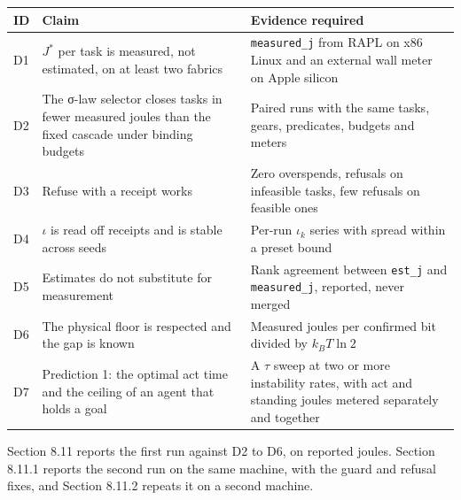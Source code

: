 \documentclass[
  10pt,
]{article}
\newcounter{none} %
\begin{document}
{\def\LTcaptype{none} %
\begin{longtable}[]{@{}
  >{\raggedright\arraybackslash}p{}
  >{\raggedright\arraybackslash}p{}
  >{\raggedright\arraybackslash}p{}@{}}
\toprule\noalign{}
\begin{minipage}[b]{\linewidth}\raggedright
ID
\end{minipage} & \begin{minipage}[b]{\linewidth}\raggedright
Claim
\end{minipage} & \begin{minipage}[b]{\linewidth}\raggedright
Evidence required
\end{minipage} \\
\midrule\noalign{}
\endhead
\bottomrule\noalign{}
\endlastfoot
D1 & \(J^*\) per task is measured, not estimated, on at least two
fabrics & \texttt{measured\_j} from RAPL on x86 Linux and an external
wall meter on Apple silicon \\
D2 & The σ-law selector closes tasks in fewer measured joules than the
fixed cascade under binding budgets & Paired runs with the same tasks,
gears, predicates, budgets and meters \\
D3 & Refuse with a receipt works & Zero overspends, refusals on
infeasible tasks, few refusals on feasible ones \\
D4 & \(\iota\) is read off receipts and is stable across seeds & Per-run
\(\iota_k\) series with spread within a preset bound \\
D5 & Estimates do not substitute for measurement & Rank agreement
between \texttt{est\_j} and \texttt{measured\_j}, reported, never
merged \\
D6 & The physical floor is respected and the gap is known & Measured
joules per confirmed bit divided by \(k_B T \ln 2\) \\
D7 & Prediction 1: the optimal act time and the ceiling of an agent that
holds a goal & A \(\tau\) sweep at two or more instability rates, with
act and standing joules metered separately and together \\
\end{longtable}
}

Section 8.11 reports the first run against D2 to D6, on reported joules.
Section 8.11.1 reports the second run on the same machine, with the
guard and refusal fixes, and Section 8.11.2 repeats it on a second
machine.
\end{document}
